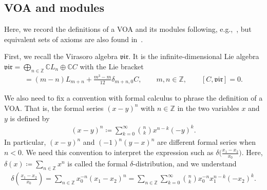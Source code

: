 \documentclass[10pt,a4paper]{amsart}
\numberwithin{equation}{section}
\newcommand{\bC}{\mathbb{C}}
\newcommand{\bZ}{\mathbb{Z}}
\newcommand{\vir}{\mathfrak{vir}}
\begin{document}
\subsection{VOA and modules}
Here, we record the definitions of a VOA and its modules following, e.g.,~\cite{FLM-VOAs_Monster,Lepowsky_Li-VOA}, but equivalent sets of axioms are also found in~\cite{FrenkelBen-Zvi2004,Kac-vertex_algebras}.

First, we recall the Virasoro algebra $\vir$.
It is the infinite-dimensional Lie algebra $\vir=\bigoplus_{n\in\bZ}\bC L_{n}\oplus \bC C$ with the Lie bracket
\begin{align*}
 [L_{m},L_{n}]=(m-n)L_{m+n}+\frac{m^{3}-m}{12}\delta_{m+n,0}C,\qquad m,n\in\bZ, \qquad
 [C,\vir] = 0.
\end{align*}

We also need to fix a convention with formal calculus to phrase the definition of a VOA.
That is, the formal series $(x-y)^{n}$ with $n\in\mathbb{Z}$ in the two variables $x$ and $y$ is defined by
\begin{align*}
	(x-y)^{n} \coloneqq \sum_{k=0}^{\infty}\binom{n}{k}x^{n-k}(-y)^{k}.
\end{align*}
In particular, $(x-y)^{n}$ and $(-1)^{n}(y-x)^{n}$ are different formal series when $n<0$.
We need this convention to interpret the expression such as
$
	\delta \big(\frac{x_{1}-x_{2}}{x_{0}}\big)$.
Here, $\delta (x) \coloneqq \sum_{n\in\bZ}x^{n}$ is called the formal $\delta$-distribution,
and we understand
\begin{align*}
	\delta \left(\frac{x_{1}-x_{2}}{x_{0}}\right)
	=\sum_{n\in\bZ}x_{0}^{-n}(x_{1}-x_{2})^{n}
	=\sum_{n\in\bZ}\sum_{k=0}^{\infty}\binom{n}{k}x_{0}^{-n}x_{1}^{n-k}(-x_{2})^{k}.
\end{align*}
\end{document}

